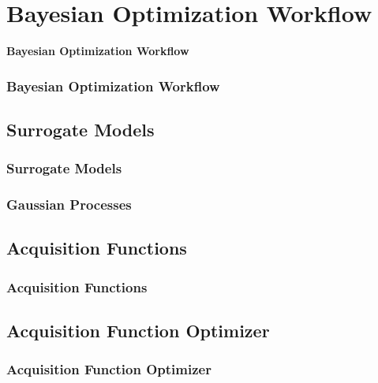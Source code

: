 \section{Bayesian Optimization Workflow}
\begin{frame}[plain, c]
    \begin{center}
        \Huge \textcolor{NavyBlue}{\textbf{Bayesian Optimization Workflow}}
    \end{center}
\end{frame}

\begin{frame}
    \frametitle{Bayesian Optimization Workflow}
\end{frame}

\subsection{Surrogate Models}
\begin{frame}
    \frametitle{Surrogate Models}
\end{frame}

\begin{frame}
    \frametitle{Gaussian Processes}
\end{frame}

\subsection{Acquisition Functions}
\begin{frame}
    \frametitle{Acquisition Functions}
\end{frame}

\subsection{Acquisition Function Optimizer}
\begin{frame}
    \frametitle{Acquisition Function Optimizer}
\end{frame}